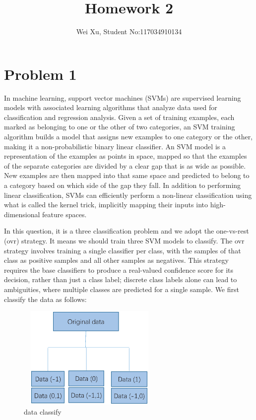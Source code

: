 \documentclass[12pt,onecolumn]{IEEEtran}
\begin{document}

	
\title{Homework 2}
	

\author{Wei Xu, Student No:117034910134}
	
	
	
	
	
\maketitle
\section{Problem 1}
In machine learning, support vector machines (SVMs) are supervised learning models with associated learning algorithms that analyze data used for classification and regression analysis.  Given a set of training examples, each marked as belonging to one or the other of two categories, an SVM training algorithm builds a model that assigns new examples to one category or the other, making it a non-probabilistic binary linear classifier. An SVM model is a representation of the examples as points in space, mapped so that the examples of the separate categories are divided by a clear gap that is as wide as possible. New examples are then mapped into that same space and predicted to belong to a category based on which side of the gap they fall.
In addition to performing linear classification, SVMs can efficiently perform a non-linear classification using what is called the kernel trick, implicitly mapping their inputs into high-dimensional feature spaces.

In this question, it is a three classification problem and we adopt the one-vs-rest (ovr) strategy. It means we should train three SVM models to classify. The ovr strategy involves training a single classifier per class, with the samples of that class as positive samples and all other samples as negatives. This strategy requires the base classifiers to produce a real-valued confidence score for its decision, rather than just a class label; discrete class labels alone can lead to ambiguities, where multiple classes are predicted for a single sample. We first classify the data as follows:
\begin{figure}[H]
	\centering
	\includegraphics[width=7cm,height=5cm]{classify.eps}
	\caption{data classify}
\end{figure}
\end{document}
